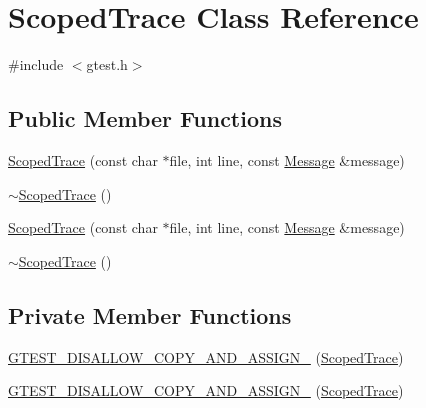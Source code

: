 \hypertarget{classtesting_1_1internal_1_1ScopedTrace}{\section{\-Scoped\-Trace \-Class \-Reference}
\label{d8/d68/classtesting_1_1internal_1_1ScopedTrace}
}


{\ttfamily \#include $<$gtest.\-h$>$}

\subsection*{\-Public \-Member \-Functions}
\begin{DoxyCompactItemize}
\item 
\hyperlink{classtesting_1_1internal_1_1ScopedTrace_a4c2fc42261af156212deb572aab8e88b}{\-Scoped\-Trace} (const char $\ast$file, int line, const \hyperlink{classtesting_1_1Message}{\-Message} \&message)
\item 
\hyperlink{classtesting_1_1internal_1_1ScopedTrace_a0bd652af94f27e7d9b40cf9369df948c}{$\sim$\-Scoped\-Trace} ()
\item 
\hyperlink{classtesting_1_1internal_1_1ScopedTrace_a4c2fc42261af156212deb572aab8e88b}{\-Scoped\-Trace} (const char $\ast$file, int line, const \hyperlink{classtesting_1_1Message}{\-Message} \&message)
\item 
\hyperlink{classtesting_1_1internal_1_1ScopedTrace_a0bd652af94f27e7d9b40cf9369df948c}{$\sim$\-Scoped\-Trace} ()
\end{DoxyCompactItemize}
\subsection*{\-Private \-Member \-Functions}
\begin{DoxyCompactItemize}
\item 
\hyperlink{classtesting_1_1internal_1_1ScopedTrace_a184415dcd7d5e3cc336e6eda3d650732}{\-G\-T\-E\-S\-T\-\_\-\-D\-I\-S\-A\-L\-L\-O\-W\-\_\-\-C\-O\-P\-Y\-\_\-\-A\-N\-D\-\_\-\-A\-S\-S\-I\-G\-N\-\_\-} (\hyperlink{classtesting_1_1internal_1_1ScopedTrace}{\-Scoped\-Trace})
\item 
\hyperlink{classtesting_1_1internal_1_1ScopedTrace_a184415dcd7d5e3cc336e6eda3d650732}{\-G\-T\-E\-S\-T\-\_\-\-D\-I\-S\-A\-L\-L\-O\-W\-\_\-\-C\-O\-P\-Y\-\_\-\-A\-N\-D\-\_\-\-A\-S\-S\-I\-G\-N\-\_\-} (\hyperlink{classtesting_1_1internal_1_1ScopedTrace}{\-Scoped\-Trace})
\end{DoxyCompactItemize}


